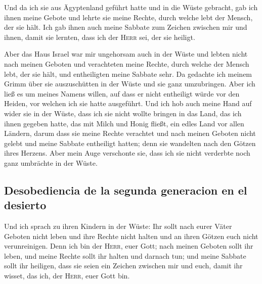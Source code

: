  Und da ich sie aus Ägyptenland geführt hatte und in die
Wüste gebracht,  gab ich ihnen meine Gebote und lehrte
sie meine Rechte, durch welche lebt der Mensch, der sie hält.
 Ich gab ihnen auch meine Sabbate zum Zeichen zwischen
mir und ihnen, damit sie lernten, dass ich der \textsc{Herr} sei, der
sie heiligt.

 Aber das Haus Israel war mir ungehorsam auch in der
Wüste und lebten nicht nach meinen Geboten und verachteten meine Rechte,
durch welche der Mensch lebt, der sie hält, und entheiligten meine
Sabbate sehr. Da gedachte ich meinem Grimm über sie auszuschütten in der
Wüste und sie ganz umzubringen.  Aber ich ließ es um
meines Namens willen, auf dass er nicht entheiligt würde vor den Heiden,
vor welchen ich sie hatte ausgeführt.  Und ich hob auch
meine Hand auf wider sie in der Wüste, dass ich sie nicht wollte bringen
in das Land, das ich ihnen gegeben hatte, das mit Milch und Honig
fließt, ein edles Land vor allen Ländern,  darum dass sie
meine Rechte verachtet und nach meinen Geboten nicht gelebt und meine
Sabbate entheiligt hatten; denn sie wandelten nach den Götzen ihres
Herzens.  Aber mein Auge verschonte sie, dass ich sie
nicht verderbte noch ganz umbrächte in der Wüste.

\hypertarget{desobediencia-de-la-segunda-generacion-en-el-desierto}{%
\subsection{Desobediencia de la segunda generacion en el
desierto}\label{desobediencia-de-la-segunda-generacion-en-el-desierto}}

 Und ich sprach zu ihren Kindern in der Wüste: Ihr sollt
nach eurer Väter Geboten nicht leben und ihre Rechte nicht halten und an
ihren Götzen euch nicht verunreinigen.  Denn ich bin der
\textsc{Herr}, euer Gott; nach meinen Geboten sollt ihr leben, und meine
Rechte sollt ihr halten und darnach tun;  und meine
Sabbate sollt ihr heiligen, dass sie seien ein Zeichen zwischen mir und
euch, damit ihr wisset, das ich, der \textsc{Herr}, euer Gott bin.

